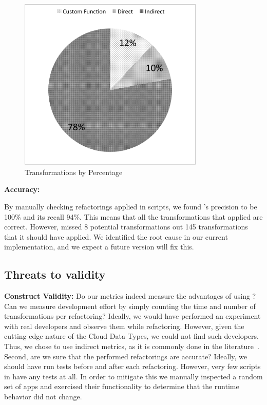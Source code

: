 \documentclass[preprint]{sigplanconf}
\begin{document}
\begin{figure}[htbp!]
\begin{center}
\includegraphics[width=250pt]{images/TransformationsChart}
\nocaptionrule
\caption{Transformations by Percentage}
\label{fig:transformations_pieChart}
\end{center}
\end{figure}

\textbf{Accuracy:}

By manually checking refactorings applied in \numManual scripts, we found \tool's precision to be 100\% and its recall 94\%. This means that all the transformations that \tool applied are correct. However, \tool missed 8 potential transformations out 145 transformations that it should have applied. We identified the root cause in our current implementation, and we expect a future version will fix this. 

\subsection{Threats to validity}
\textbf{Construct Validity:}  Do our metrics indeed measure the advantages of using \tool? Can we measure development effort by simply counting the time and number of transformations per refactoring? Ideally, we would have performed an experiment with real \TD developers and observe them while refactoring. However, given the cutting edge nature of the Cloud Data Types, we could not find such developers. Thus, we chose to use indirect metrics, as it is commonly done in the literature~\cite{Gyori:Lambdaficator,Wloka:Reentrancer}. 
Second, are we sure that the performed refactorings are accurate? Ideally, we should have run tests before and after each refactoring. However, very few scripts in \TD have any tests at all. In order to mitigate this we manually inspected a random set of \numManual apps and exercised their functionality to determine that the runtime behavior did not change.
\end{document}
